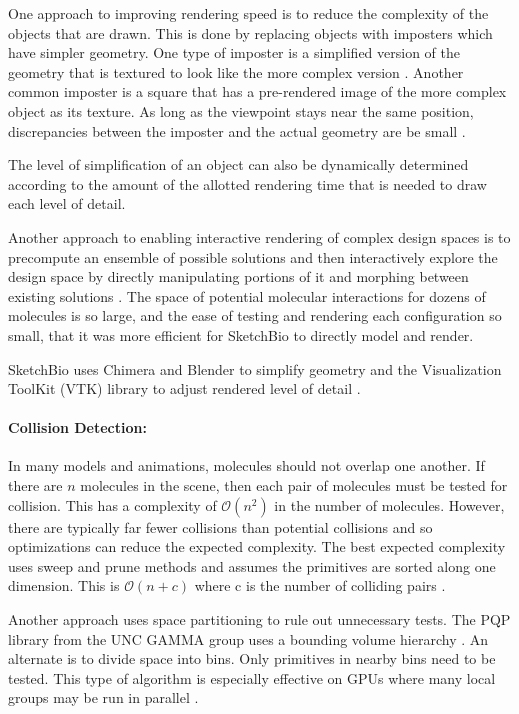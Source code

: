 \documentclass[twocolumn]{bmcart}%
\begin{document}
One approach to improving rendering speed is to reduce the complexity of the objects that are drawn.
This is done by replacing objects with imposters which have simpler geometry.
One type of imposter is a simplified version of the geometry that is textured to look like the more complex version \cite{decoret2003billboard,erikson1998simplification,cohen1998appearance}.
Another common imposter is a square that has a pre-rendered image of the more complex object as its texture.  As long as the viewpoint stays near the same position, discrepancies between the imposter and the actual geometry are be small \cite{aliaga1996visualization,maciel1995visual}.

The level of simplification of an object can also be dynamically determined according to the amount of the allotted rendering time that is needed to draw each level of detail.

Another approach to enabling interactive rendering of complex design spaces is to precompute an ensemble of possible solutions and then interactively explore the design space by directly manipulating portions of it and morphing between existing solutions \cite{Coffey2013}. The space of potential molecular interactions for dozens of molecules is so large, and the ease of testing and rendering each configuration so small, that it was more efficient for SketchBio to directly model and render.

SketchBio uses Chimera and Blender to simplify geometry and the Visualization ToolKit (VTK) library to adjust rendered level of detail \cite{VTKbook}.

\paragraph*{Collision Detection:}
In many models and animations, molecules should not overlap one another.
If there are $n$ molecules in the scene, then each pair of molecules must be tested for collision.
This has a complexity of $\mathcal{O}(n^2)$ in the number of molecules.
However, there are typically far fewer collisions than potential collisions and so optimizations can reduce the expected complexity.
The best expected complexity uses sweep and prune methods and assumes the primitives are sorted along one dimension. This is $\mathcal{O}(n + c)$ where c is the number of colliding pairs \cite{tracy2009efficient}.

Another approach uses space partitioning to rule out unnecessary tests.
The PQP library from the UNC GAMMA group uses a bounding volume hierarchy \cite{PQP}.
An alternate is to divide space into bins.
Only primitives in nearby bins need to be tested.
This type of algorithm is especially effective on GPUs where many local groups may be run in parallel \cite{oat2008efficient}.
\end{document}
